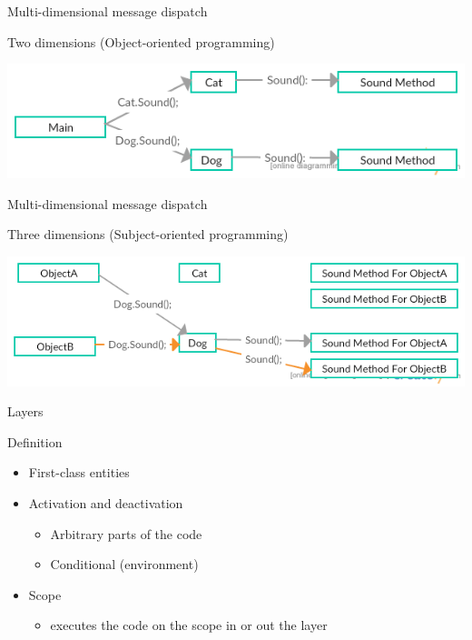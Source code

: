 \documentclass[presentation]{beamer}
\begin{document}
\begin{frame}[label={sec:orge354381}]{Multi-dimensional message dispatch}
\begin{block}{Two dimensions (Object-oriented programming)}
\begin{center}
\includegraphics[width=.9\linewidth]{./two.png}
\end{center}
\end{block}
\end{frame}


\begin{frame}[label={sec:org58f7b3a}]{Multi-dimensional message dispatch}
\begin{block}{Three dimensions (Subject-oriented programming)}
\begin{center}
\includegraphics[width=.9\linewidth]{./three.png}
\end{center}
\end{block}
\end{frame}


\begin{frame}[label={sec:org8d86638}]{Layers}
\begin{block}{Definition}
\begin{itemize}
\item First-class entities
\item Activation and deactivation
\begin{itemize}
\item Arbitrary parts of the code
\item Conditional (environment)
\end{itemize}
\item Scope
\begin{itemize}
\item executes the code on the scope in or out the layer
\end{itemize}
\end{itemize}
\end{block}
\end{frame}
\end{document}
